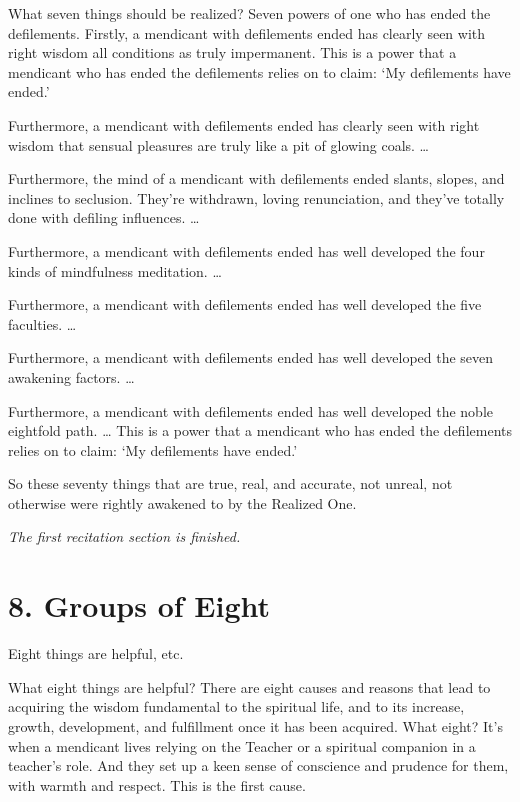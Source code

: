 \documentclass[12pt,openany]{book}%
\newcommand*{\scendsection}[1]{\begin{center}\textit{#1}\end{center}}
\begin{document}
What seven things should be realized? Seven powers of one who has ended the defilements. Firstly, a mendicant with defilements ended has clearly seen with right wisdom all conditions as truly impermanent. This is a power that a mendicant who has ended the defilements relies on to claim: ‘My defilements have ended.’ 

Furthermore, a mendicant with defilements ended has clearly seen with right wisdom that sensual pleasures are truly like a pit of glowing coals. … 

Furthermore, the mind of a mendicant with defilements ended slants, slopes, and inclines to seclusion. They’re withdrawn, loving renunciation, and they’ve totally done with defiling influences. … 

Furthermore, a mendicant with defilements ended has well developed the four kinds of mindfulness meditation. … 

Furthermore, a mendicant with defilements ended has well developed the five faculties. … 

Furthermore, a mendicant with defilements ended has well developed the seven awakening factors. … 

Furthermore, a mendicant with defilements ended has well developed the noble eightfold path. … This is a power that a mendicant who has ended the defilements relies on to claim: ‘My defilements have ended.’ 

So these seventy things that are true, real, and accurate, not unreal, not otherwise were rightly awakened to by the Realized One. 

\scendsection{The first recitation section is finished. }

\section*{8. Groups of Eight }

Eight things are helpful, etc. 

What eight things are helpful? There are eight causes and reasons that lead to acquiring the wisdom fundamental to the spiritual life, and to its increase, growth, development, and fulfillment once it has been acquired. What eight? It’s when a mendicant lives relying on the Teacher or a spiritual companion in a teacher’s role. And they set up a keen sense of conscience and prudence for them, with warmth and respect. This is the first cause. 
\end{document}
